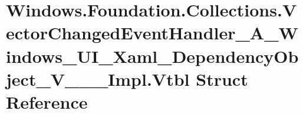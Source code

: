 \hypertarget{struct_windows_1_1_foundation_1_1_collections_1_1_vector_changed_event_handler___a___windows___ube91dabf53d084dfd6eb7cefa21564f8}{}\section{Windows.\+Foundation.\+Collections.\+Vector\+Changed\+Event\+Handler\+\_\+\+A\+\_\+\+Windows\+\_\+\+U\+I\+\_\+\+Xaml\+\_\+\+Dependency\+Object\+\_\+\+V\+\_\+\+\_\+\+\_\+\+Impl.\+Vtbl Struct Reference}
\label{struct_windows_1_1_foundation_1_1_collections_1_1_vector_changed_event_handler___a___windows___ube91dabf53d084dfd6eb7cefa21564f8}
